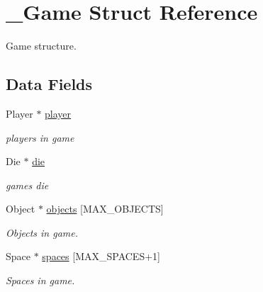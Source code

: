 \hypertarget{struct__Game}{}\section{\+\_\+\+Game Struct Reference}
\label{struct__Game}


Game structure.  


\subsection*{Data Fields}
\begin{DoxyCompactItemize}
\item 
\mbox{\label{struct__Game_a31406605782d71ec00c4bf258ea76267}} 
Player $\ast$ \hyperlink{struct__Game_a31406605782d71ec00c4bf258ea76267}{player}
\begin{DoxyCompactList}\small\item\em players in game \end{DoxyCompactList}\item 
\mbox{\label{struct__Game_a0d6009b5dcb080489c192a9198fa7d46}} 
Die $\ast$ \hyperlink{struct__Game_a0d6009b5dcb080489c192a9198fa7d46}{die}
\begin{DoxyCompactList}\small\item\em game\textquotesingle{}s die \end{DoxyCompactList}\item 
\mbox{\label{struct__Game_ad45bf5645a26e546d0060a2e61f9cf81}} 
Object $\ast$ \hyperlink{struct__Game_ad45bf5645a26e546d0060a2e61f9cf81}{objects} \mbox{[}M\+A\+X\+\_\+\+O\+B\+J\+E\+C\+TS\mbox{]}
\begin{DoxyCompactList}\small\item\em Objects in game. \end{DoxyCompactList}\item 
\mbox{\label{struct__Game_ab4180417d9148f8abb2233ca6c4ecfe5}} 
Space $\ast$ \hyperlink{struct__Game_ab4180417d9148f8abb2233ca6c4ecfe5}{spaces} \mbox{[}M\+A\+X\+\_\+\+S\+P\+A\+C\+ES+1\mbox{]}
\begin{DoxyCompactList}\small\item\em Spaces in game. \end{DoxyCompactList}\item 
\mbox{\label{struct__Game_ac98c89af82c9ffde3f17e7f4929bb97c}} 

\end{DoxyCompactItemize}
